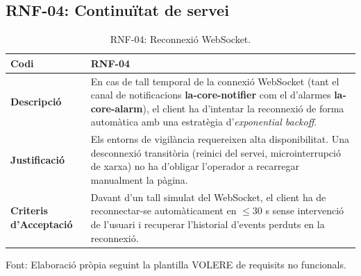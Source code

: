 \subsection{RNF-04: Continuïtat de servei}
\begin{table}[htbp]
  \centering
  \small
  \begin{tabular}{|l|p{10cm}|}
    \hline
    \textbf{Codi}                    & RNF-04 \\ \hline
    \textbf{Descripció}              & En cas de tall temporal de la connexió WebSocket (tant el canal de notificacions \textbf{la-core-notifier} com el d'alarmes \textbf{la-core-alarm}), el client ha d'intentar la reconnexió de forma automàtica amb una estratègia d'\textit{exponential backoff}. \\ \hline
    \textbf{Justificació}            & Els entorns de vigilància requereixen alta disponibilitat. Una desconnexió transitòria (reinici del servei, microinterrupció de xarxa) no ha d'obligar l'operador a recarregar manualment la pàgina. \\ \hline
    \textbf{Criteris d'Acceptació}   & Davant d'un tall simulat del WebSocket, el client ha de reconnectar-se automàticament en $\leq 30$ s sense intervenció de l'usuari i recuperar l'historial d'events perduts en la reconnexió. \\ \hline
  \end{tabular}
  \caption{RNF-04: Reconnexió WebSocket.}
  \label{tab:rnf04}
\par\smallskip
\small Font: Elaboració pròpia seguint la plantilla VOLERE de requisits no funcionals.
\end{table}

\clearpage

